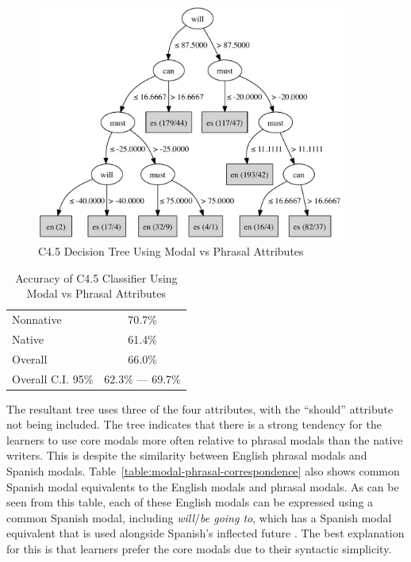 \documentclass[main.tex]{subfiles}
\begin{document}
\begin{figure}[htbp]
\centering
\includegraphics[width=4in]{modal-phrasal-tree.pdf}
\caption{C4.5 Decision Tree Using Modal vs Phrasal Attributes}
\label{fig:modal-phrasal-tree}
\end{figure}
\begin{table}[htbp]
\centering
\caption{Accuracy of C4.5 Classifier Using Modal vs Phrasal Attributes}
\begin{tabular}{l c}
\toprule
Nonnative & 70.7\% \\
Native & 61.4\% \\
Overall & 66.0\% \\
Overall C.I. 95\% & 62.3\% --- 69.7\%\\
\bottomrule
\end{tabular}
\label{table:modal-phrasal-results}
\end{table}

The resultant tree uses three of the four attributes, with the ``should'' attribute not being included. The tree indicates that there is a strong tendency for the learners to use core modals more often relative to phrasal modals than the native writers. This is despite the similarity between English phrasal modals and Spanish modals. Table~\ref{table:modal-phrasal-correspondence} also shows common Spanish modal equivalents to the English modals and phrasal modals. As can be seen from this table, each of these English modals can be expressed using a common Spanish modal, including \textit{will}/\textit{be going to}, which has a Spanish modal equivalent that is used alongside Spanish's inflected future \citep[ch. 14.6.4]{butt}. The best explanation for this is that learners prefer the core modals due to their syntactic simplicity.
\end{document}
